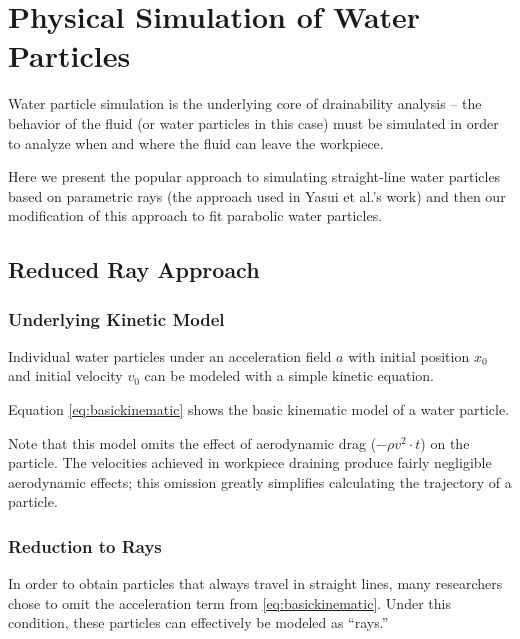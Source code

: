 						\chapter{Physical Simulation of Water Particles}

Water particle simulation is the underlying core of drainability analysis -- the behavior of the fluid (or water particles in this case) must be simulated in order to analyze when and where the fluid can leave the workpiece.

Here we present the popular approach to simulating straight-line water particles based on parametric rays (the approach used in Yasui et al.'s work) and then our modification of this approach to fit parabolic water particles.

\section{Reduced Ray Approach}

	\subsection{Underlying Kinetic Model}

Individual water particles under an acceleration field $a$ with initial position $x_0$ and initial velocity $v_0$ can be modeled with a simple kinetic equation.


Equation \eqref{eq:basickinematic} shows the basic kinematic model of a water particle.


Note that this model omits the effect of aerodynamic drag ($-\rho v^2 \cdot t$) on the particle. The velocities achieved in workpiece draining produce fairly negligible aerodynamic effects; this omission greatly simplifies calculating the trajectory of a particle.

	\subsection{Reduction to Rays}

In order to obtain particles that always travel in straight lines, many researchers chose to omit the acceleration term from \eqref{eq:basickinematic}. Under this condition, these particles can effectively be modeled as ``rays.''


